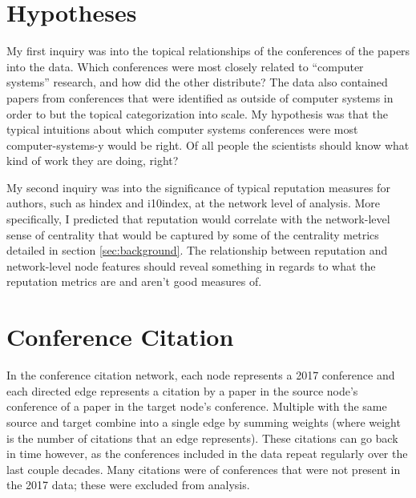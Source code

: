 \documentclass{article}
\begin{document}
\section{Hypotheses}
\label{sec:hypotheses}

My first inquiry was into the topical relationships of the conferences of the papers into the data.
Which conferences were most closely related to ``computer systems'' research, and how did the other distribute?
The data also contained papers from conferences that were identified as outside of computer systems in order to but the topical categorization into scale.
My hypothesis was that the typical intuitions about which computer systems conferences were most computer-systems-y would be right.
Of all people the scientists should know what kind of work they are doing, right?

My second inquiry was into the significance of typical reputation measures for authors, such as hindex and i10index, at the network level of analysis. More specifically, I predicted that reputation would correlate with the network-level sense of centrality that would be captured by some of the centrality metrics detailed in section \ref{sec:background}. The relationship between reputation and network-level node features should reveal something in regards to what the reputation metrics are and aren't good measures of.

\section{Conference Citation}
\label{sec:conference-citation}

In the conference citation network, each node represents a 2017 conference and each directed edge represents a citation by a paper in the source node's conference of a paper in the target node's conference.
Multiple with the same source and target combine into a single edge by summing weights (where weight is the number of citations that an edge represents).
These citations can go back in time however, as the conferences included in the data repeat regularly over the last couple decades.
Many citations were of conferences that were not present in the 2017 data; these were excluded from analysis.
\end{document}
